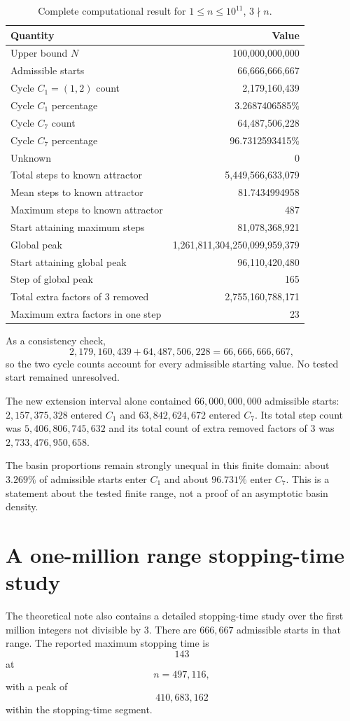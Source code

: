 \documentclass[11pt]{article}
\begin{document}
\begin{table}[h]
\centering
\caption{Complete computational result for $1\le n\le10^{11}$, $3\nmid n$.}
\label{tab:main}
\begin{tabular}{lr}
\toprule
Quantity & Value\\
\midrule
Upper bound $N$ & 100,000,000,000\\
Admissible starts & 66,666,666,667\\
Cycle $C_1=(1,2)$ count & 2,179,160,439\\
Cycle $C_1$ percentage & 3.2687406585\%\\
Cycle $C_7$ count & 64,487,506,228\\
Cycle $C_7$ percentage & 96.7312593415\%\\
Unknown & 0\\
Total steps to known attractor & 5,449,566,633,079\\
Mean steps to known attractor & 81.7434994958\\
Maximum steps to known attractor & 487\\
Start attaining maximum steps & 81,078,368,921\\
Global peak & 1,261,811,304,250,099,959,379\\
Start attaining global peak & 96,110,420,480\\
Step of global peak & 165\\
Total extra factors of $3$ removed & 2,755,160,788,171\\
Maximum extra factors in one step & 23\\
\bottomrule
\end{tabular}
\end{table}

As a consistency check,
\[
2,179,160,439+64,487,506,228=66,666,666,667,
\]
so the two cycle counts account for every admissible starting value. No tested start remained unresolved.

The new extension interval alone contained $66,000,000,000$ admissible starts: $2,157,375,328$ entered $C_1$ and $63,842,624,672$ entered $C_7$. Its total step count was $5,406,806,745,632$ and its total count of extra removed factors of $3$ was $2,733,476,950,658$.

The basin proportions remain strongly unequal in this finite domain: about $3.269\%$ of admissible starts enter $C_1$ and about $96.731\%$ enter $C_7$. This is a statement about the tested finite range, not a proof of an asymptotic basin density.

\section{A one-million range stopping-time study}
The theoretical note also contains a detailed stopping-time study over the first million integers not divisible by $3$. There are $666,667$ admissible starts in that range. The reported maximum stopping time is
\[
143
\]
at
\[
n=497,116,
\]
with a peak of
\[
410,683,162
\]
within the stopping-time segment.
\end{document}
